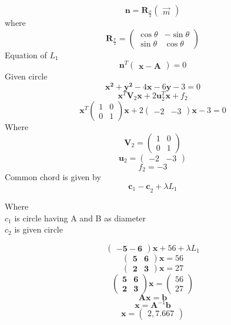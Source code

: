\documentclass[journal,12pt,twocolumn]{IEEEtran}
\newcommand{\myvec}[1]{\ensuremath{\begin{pmatrix}#1\end{pmatrix}}}
\let\vec\mathbf
\begin{document}
\begin{equation}
    \vec{n} = \vec{R}_{\frac{\pi}{2}} \myvec{\Vec{m}}
\end{equation}
where
    \[ \vec{R}_{\frac{\pi}{2}} = \myvec{\cos  \theta & -\sin \theta \\ \sin \theta & \cos \theta}\]
Equation of $L_1$
\begin{equation}
    \vec{n}^T{\myvec{\vec x-\vec A}}=0
\end{equation}
Given circle
\begin{equation}
    \vec{{x}^2+{y}^2}-4{\vec x}-6{\vec y}-3=0
\end{equation}
\begin{equation}
    {\vec{{x}}^T{\vec V}_2{\vec x}+2{\vec u}_2^T{\vec x}}+f_2
\end{equation}
\begin{equation}
   { \vec{{x}}^T{\myvec{1&0\\0&1}}{\vec x}}+2{\myvec{-2&-3}}{\vec x}-3=0
\end{equation}
Where
\begin{equation}
    {\vec V}_2 = {\myvec{1&0\\0&1}}
\end{equation}
\begin{equation}
    {\vec{u}_2}={\myvec{-2&-3}}
\end{equation}
\begin{equation}
    f_2={-3}
\end{equation}
Common chord is given by
\begin{equation}
    {\vec{c}_1-{\vec c}}_2+\lambda{L_1}
\end{equation}

Where\\ $c_1$ is circle having A and B as diameter\\
        $c_2$ is given circle


\begin{equation}
    \vec{\myvec{-5-6}}{\vec x}+56+\lambda L_1
\end{equation}
\begin{equation}
    \vec{\myvec{5&6}}{\vec x}=56
\end{equation}
\begin{equation}
    \vec{\myvec{2&3}}{\vec x}=27
\end{equation}
\begin{equation}
    \vec{\myvec{5&6\\2&3}}{\vec x}={\myvec{56\\27}}
\end{equation}
\begin{equation}
    \vec {A x= b}
\end{equation}
\begin{equation}
    {\vec{x={A}}^{-1} {\vec b}}
\end{equation}
\begin{equation}
    \vec{x}={\myvec{2,7.667}}
\end{equation}
\end{document}
